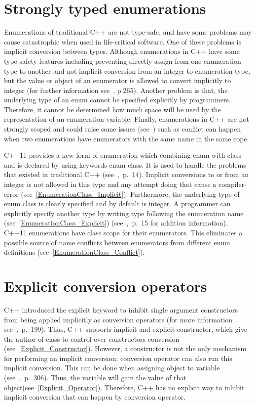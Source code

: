\documentclass[11pt]{report}
\begin{document}
\section{Strongly typed enumerations}
\label{section: Strongly typed enumerations}
Enumerations of traditional C++ are not type-safe, and have some problems may cause catastrophic when used in life-critical software. One of these problems is implicit conversion between types. Although enumerations in C++ have some type safety features including preventing directly assign from one enumeration type to another and not implicit conversion from an integer to enumeration type, but the value or object of an enumerator is allowed to convert implicitly to integer (for further information see~\cite{Overland:2011:CWF}, p.265). Another problem is that, the underlying type of an enum cannot be specified explicitly by programmers. Therefore, it cannot be determined how much space will be used by the representation of an enumeration variable. Finally, enumerations in C++ are not strongly scoped and could raise some issues (see~\cite{Stroustrup:2012:Cpp11}) such as conflict can happen when two enumerations have enumerators with the same name in the same cope.

C++11 provides a new form of enumeration which combining enum with class and is declared by using keywords enum class. It is used to handle the problems that existed in traditional C++ (see~\cite{Gregorie:professionalcpp},~p.~14). Implicit conversions to or from an integer is not allowed in this type and any attempt doing that cause a compiler-error (see~\ref{EnumerationClass_Implicit}). Furthermore, the underlying type of enum class is clearly specified and by default is integer. A programmer can explicitly specify another type by writing type following the enumeration name (see~\ref{EnumerationClass_Explicit}) (see~\cite{Gregorie:professionalcpp},~p.~15 for addition information). C++11 enumerations have class scope for their enumerators. This eliminates a possible source of name conflicts between enumerators from different enum definitions (see~\ref{EnumerationClass_Conflict}).

\section{Explicit conversion operators}
\label{section: Explicit Conversion Operators}
C++ introduced the explicit keyword to inhibit single argument constructors from being applied implicitly as conversion operators (for more information see~\cite{Gregorie:professionalcpp},~p.~199). Thus, C++ supports implicit and explicit constructor, which give the author of class to control over constructors conversion (see~\ref{Explicit_Constructor}). However, a constructor is not the only mechanism for performing an implicit conversion; conversion operator can also run this implicit conversion. This can be done when assigning object to variable (see~\cite{Gregorie:professionalcpp},~p.~306). Thus, the variable will gain the value of that object(see~\ref{Explicit_Operator}). Therefore, C++ has no explicit way to inhibit implicit conversion that can happen by conversion operator.
\end{document}
